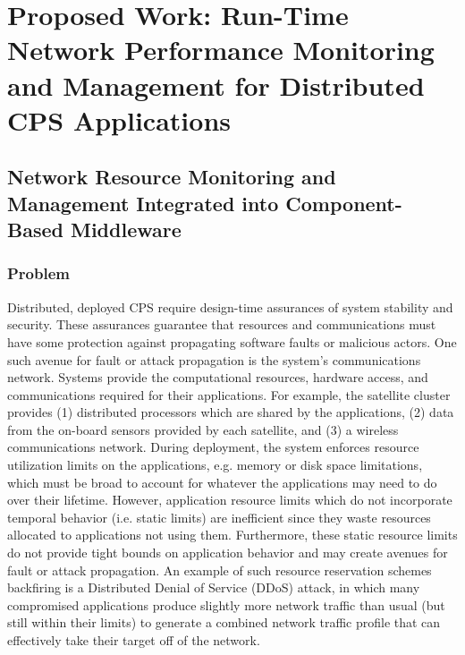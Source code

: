 \chapter{Proposed Work: Run-Time Network Performance Monitoring and Management for Distributed CPS Applications}
\label{ch:runTime}

\section{Network Resource Monitoring and Management Integrated into Component-Based Middleware}
\label{sec:drems}

\subsection{Problem}
Distributed, deployed CPS require design-time assurances of system stability and security.  These assurances guarantee that resources and communications must have some protection against propagating software faults or malicious actors.  One such avenue for fault or attack propagation is the system's communications network.  Systems provide the computational resources, hardware access, and communications required for their applications.  For example, the satellite cluster provides (1) distributed processors which are shared by the applications, (2) data from the on-board sensors provided by each satellite, and (3) a wireless communications network.  During deployment, the system enforces resource utilization limits on the applications, e.g. memory or disk space limitations, which must be broad to account for whatever the applications may need to do over their lifetime.  However, application resource limits which do not incorporate temporal behavior (i.e. static limits) are inefficient since they waste resources allocated to applications not using them.  Furthermore, these static resource limits do not provide tight bounds on application behavior and may create avenues for fault or attack propagation.  An example of such resource reservation schemes backfiring is a Distributed Denial of Service (DDoS) attack, in which many compromised applications produce slightly more network traffic than usual (but still within their limits) to generate a combined network traffic profile that can effectively take their target off of the network.  

